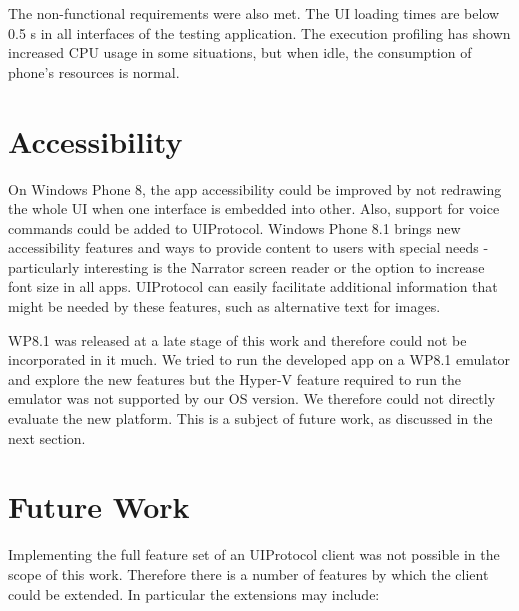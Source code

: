 The non-functional requirements were also met. The UI loading times are below 0.5 s in all interfaces of the testing application. The execution profiling has shown increased CPU usage in some situations, but when idle, the consumption of phone's resources is normal.

\section{Accessibility}
On Windows Phone 8, the app accessibility could be improved by not redrawing the whole UI when one interface is embedded into other. Also, support for voice commands could be added to UIProtocol. Windows Phone 8.1 brings new accessibility features and ways to provide content to users with special needs - particularly interesting is the Narrator screen reader or the option to increase font size in all apps.
UIProtocol can easily facilitate additional information that might be needed by these features, such as alternative text for images.

WP8.1 was released at a late stage of this work and therefore could not be incorporated in it much. We tried to run the developed app on a WP8.1 emulator and explore the new features but the Hyper-V feature required to run the emulator was not supported by our OS version. We therefore could not directly evaluate the new platform. This is a subject of future work, as discussed in the next section.



\section{Future Work}
Implementing the full feature set of an UIProtocol client was not possible in the scope of this work. Therefore there is a number of features by which the client could be extended. In particular the extensions may include:\\

